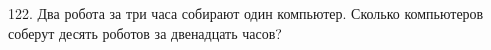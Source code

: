 122. Два робота за три часа собирают один компьютер. Сколько компьютеров соберут десять роботов за двенадцать часов?\\

